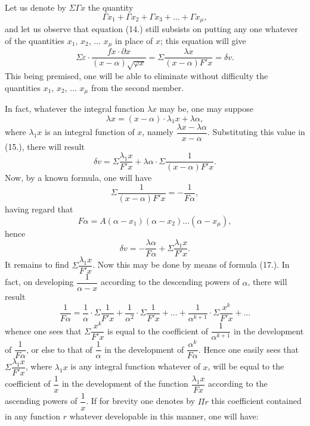 \documentclass{article}
\begin{document}
Let us denote by $\Sigma\Gamma x$ the quantity
\[ \Gamma x_1 + \Gamma x_2 + \Gamma x_3 + \ldots + \Gamma x_\mu, \]
and let us observe that equation (14.) still subsists on putting any one whatever of the quantities $x_1$, $x_2$, $\ldots$ $x_\mu$ in place of $x$; this equation will give
\[ \Sigma\varepsilon \cdot \frac{fx \cdot \partial x}{(x-\alpha)\sqrt{\varphi x}} = \Sigma\frac{\lambda x}{(x-\alpha)F'x} = \delta v. \tag{15} \]
This being premised, one will be able to eliminate without difficulty the quantities $x_1$, $x_2$, $\ldots$ $x_\mu$ from the second member.

In fact, whatever the integral function $\lambda x$ may be, one may suppose
\[ \lambda x = (x-\alpha) \cdot \lambda_1 x + \lambda\alpha, \]
where $\lambda_1 x$ is an integral function of $x$, namely $\dfrac{\lambda x - \lambda\alpha}{x-\alpha}$. Substituting this value in (15.), there will result
\[ \delta v = \Sigma\frac{\lambda_1 x}{F'x} + \lambda\alpha \cdot \Sigma\frac{1}{(x-\alpha)F'x}. \tag{16'} \]
Now, by a known formula, one will have
\[ \Sigma\frac{1}{(x-\alpha)F'x} = -\frac{1}{F\alpha}, \tag{17} \]
having regard that
\[ F\alpha = A(\alpha-x_1)(\alpha-x_2)\ldots(\alpha-x_\mu), \]
hence
\[ \delta v = -\frac{\lambda\alpha}{F\alpha} + \Sigma\frac{\lambda_1 x}{F'x}. \tag{18} \]
It remains to find $\Sigma\dfrac{\lambda_1 x}{F'x}$. Now this may be done by means of formula (17.). In fact, on developing $\dfrac{1}{\alpha-x}$ according to the descending powers of $\alpha$, there will result
\[ \frac{1}{F\alpha} = \frac{1}{\alpha} \cdot \Sigma\frac{1}{F'x} + \frac{1}{\alpha^{2}} \cdot \Sigma\frac{1}{F'x} + \ldots + \frac{1}{\alpha^{k+1}} \cdot \Sigma\frac{x^{k}}{F'x} + \ldots \tag{19} \]
whence one sees that $\Sigma\dfrac{x^{k}}{F'x}$ is equal to the coefficient of $\dfrac{1}{\alpha^{k+1}}$ in the development of $\dfrac{1}{F\alpha}$, or else to that of $\dfrac{1}{\alpha}$ in the development of $\dfrac{\alpha^{k}}{F\alpha}$. Hence one easily sees that $\Sigma\dfrac{\lambda_1 x}{F'x}$, where $\lambda_1 x$ is any integral function whatever of $x$, will be equal to the coefficient of $\dfrac{1}{x}$ in the development of the function $\dfrac{\lambda_1 x}{Fx}$ according to the ascending powers of $\dfrac{1}{x}$. If for brevity one denotes by $\Pi r$ this coefficient contained in any function $r$ whatever developable in this manner, one will have:
\end{document}
